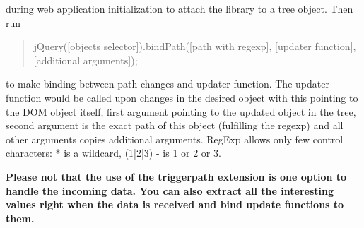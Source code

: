 during web application initialization to attach the library to a tree object. Then run

\begin{quote}jQuery([objects selector]).bindPath([path with regexp], [updater function], 
[additional arguments]);\end{quote}

to make binding between path changes and updater function. The updater function would be 
called upon changes in the desired object with this pointing to the DOM object itself, 
first argument pointing to the updated object in the tree, second argument is the exact 
path of this object (fulfilling the regexp) and all other arguments 
copies additional arguments. RegExp allows only few control characters: * 
is a wildcard, (1|2|3) - is 1 or 
2 or 3.  

\textbf{Please not that the use of the triggerpath extension is one option to handle the incoming
data. You can also extract all the interesting values right when the data is received and 
bind update functions to them.}